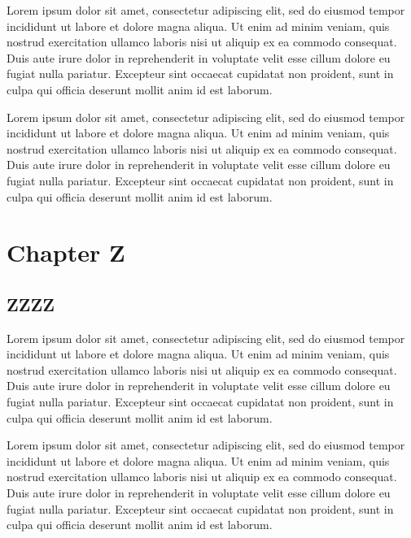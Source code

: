 \documentclass[12pt,a4paper]{article}
\begin{document}
Lorem ipsum dolor sit amet, consectetur adipiscing elit, sed do eiusmod
tempor incididunt ut labore et dolore magna aliqua. Ut enim ad minim
veniam, quis nostrud exercitation ullamco laboris nisi ut aliquip ex ea
commodo consequat. Duis aute irure dolor in reprehenderit in voluptate
velit esse cillum dolore eu fugiat nulla pariatur. Excepteur sint
occaecat cupidatat non proident, sunt in culpa qui officia deserunt
mollit anim id est laborum.

Lorem ipsum dolor sit amet, consectetur adipiscing elit, sed do eiusmod
tempor incididunt ut labore et dolore magna aliqua. Ut enim ad minim
veniam, quis nostrud exercitation ullamco laboris nisi ut aliquip ex ea
commodo consequat. Duis aute irure dolor in reprehenderit in voluptate
velit esse cillum dolore eu fugiat nulla pariatur. Excepteur sint
occaecat cupidatat non proident, sunt in culpa qui officia deserunt
mollit anim id est laborum.

\newpage


\hypertarget{chapter-z}{%
\section{Chapter Z}\label{chapter-z}}

\hypertarget{zzzz}{%
\subsection{ZZZZ}\label{zzzz}}

Lorem ipsum dolor sit amet, consectetur adipiscing elit, sed do eiusmod
tempor incididunt ut labore et dolore magna aliqua. Ut enim ad minim
veniam, quis nostrud exercitation ullamco laboris nisi ut aliquip ex ea
commodo consequat. Duis aute irure dolor in reprehenderit in voluptate
velit esse cillum dolore eu fugiat nulla pariatur. Excepteur sint
occaecat cupidatat non proident, sunt in culpa qui officia deserunt
mollit anim id est laborum.

Lorem ipsum dolor sit amet, consectetur adipiscing elit, sed do eiusmod
tempor incididunt ut labore et dolore magna aliqua. Ut enim ad minim
veniam, quis nostrud exercitation ullamco laboris nisi ut aliquip ex ea
commodo consequat. Duis aute irure dolor in reprehenderit in voluptate
velit esse cillum dolore eu fugiat nulla pariatur. Excepteur sint
occaecat cupidatat non proident, sunt in culpa qui officia deserunt
mollit anim id est laborum.
\end{document}
